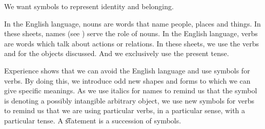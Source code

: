 

We want symbols to represent identity and belonging.


In the English language, nouns are words that name people, places and things.
In these sheets, names (see ) serve the role of nouns.
In the English language, verbs are words which talk about actions or relations.
In these sheets, we use the verbs  and  for the objects discussed.
And we exclusively use the present tense.

Experience shows that we can avoid the English language and use symbols for verbs.
By doing this, we introduce odd new shapes and forms to which we can give specific meanings.
As we use italics for names to remind us that the symbol is denoting a possibly intangible arbitrary object, we use new symbols for verbs to remind us that we are using particular verbs, in a particular sense, with a particular tense.
A \t{statement} is a succession of symbols.



